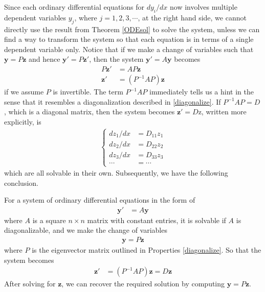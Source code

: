 Since each ordinary differential equations for $dy_i/dx$ now involves multiple dependent variables $y_j$, where $j = 1,2,3,\cdots$, at the right hand side, we cannot directly use the result from Theorem \ref{ODEsol} to solve the system, unless we can find a way to transform the system so that each equation is in terms of a single dependent variable only. Notice that if we make a change of variables such that $\textbf{y} = P\textbf{z}$ and hence $\textbf{y}' = P\textbf{z}'$, then the system $\textbf{y}' = A\textbf{y}$ becomes
\begin{align*}
P\textbf{z}' &= AP\textbf{z} \\
\textbf{z}' &= (P^{-1}AP)\textbf{z}
\end{align*}
if we assume $P$ is invertible. The term $P^{-1}AP$ immediately tells us a hint in the sense that it resembles a diagonalization described in \ref{diagonalize}. If $P^{-1}AP = D$, which is a diagonal matrix, then the system becomes $\textbf{z}' = D\text{z}$, written more explicitly, is
\begin{align*}
\begin{cases}
dz_1/dx &= D_{11}z_1 \\
dz_2/dx &= D_{22}z_2 \\
dz_3/dx &= D_{33}z_3 \\
\cdots &= \cdots
\end{cases}     
\end{align*}
which are all solvable in their own. Subsequently, we have the following conclusion.
\begin{thm}
For a system of ordinary differential equations in the form of 
\begin{align*}
\textbf{y}' &= A\textbf{y}
\end{align*}
where $A$ is a square $n \times n$ matrix with constant entries, it is solvable if $A$ is diagonalizable, and we make the change of variables
\begin{align*}
\textbf{y} = P\textbf{z}
\end{align*}
where $P$ is the eigenvector matrix outlined in Properties \ref{diagonalize}. So that the system becomes
\begin{align*}
\textbf{z}' &= (P^{-1}AP)\textbf{z} = D\textbf{z}
\end{align*}
After solving for $\textbf{z}$, we can recover the required solution by computing $\textbf{y} = P\textbf{z}$.
\end{thm}

